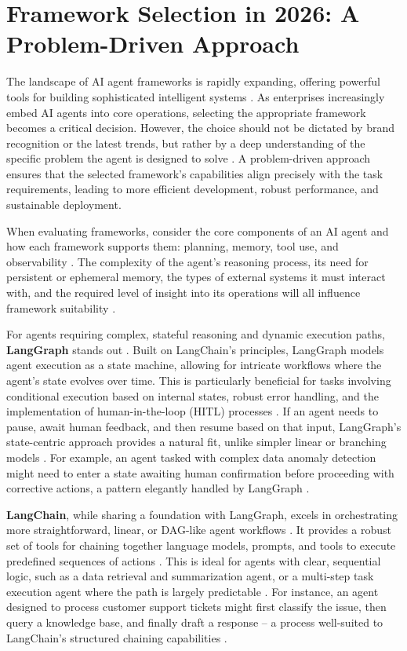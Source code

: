 \section{Framework Selection in 2026: A Problem-Driven Approach}

The landscape of AI agent frameworks is rapidly expanding, offering powerful tools for building sophisticated intelligent systems \cite{Reger2026}. As enterprises increasingly embed AI agents into core operations, selecting the appropriate framework becomes a critical decision. However, the choice should not be dictated by brand recognition or the latest trends, but rather by a deep understanding of the specific problem the agent is designed to solve \cite{Gartner2025}. A problem-driven approach ensures that the selected framework's capabilities align precisely with the task requirements, leading to more efficient development, robust performance, and sustainable deployment.

When evaluating frameworks, consider the core components of an AI agent and how each framework supports them: planning, memory, tool use, and observability \cite{Reger2026}. The complexity of the agent's reasoning process, its need for persistent or ephemeral memory, the types of external systems it must interact with, and the required level of insight into its operations will all influence framework suitability \cite{Gartner2025}.

For agents requiring complex, stateful reasoning and dynamic execution paths, \textbf{LangGraph} stands out \cite{LangGraphDocs}. Built on LangChain's principles, LangGraph models agent execution as a state machine, allowing for intricate workflows where the agent's state evolves over time. This is particularly beneficial for tasks involving conditional execution based on internal states, robust error handling, and the implementation of human-in-the-loop (HITL) processes \cite{Reger2026}. If an agent needs to pause, await human feedback, and then resume based on that input, LangGraph's state-centric approach provides a natural fit, unlike simpler linear or branching models \cite{LangGraphDocs}. For example, an agent tasked with complex data anomaly detection might need to enter a state awaiting human confirmation before proceeding with corrective actions, a pattern elegantly handled by LangGraph \cite{Reger2026}.

\textbf{LangChain}, while sharing a foundation with LangGraph, excels in orchestrating more straightforward, linear, or DAG-like agent workflows \cite{LangChainDocs}. It provides a robust set of tools for chaining together language models, prompts, and tools to execute predefined sequences of actions \cite{Reger2026}. This is ideal for agents with clear, sequential logic, such as a data retrieval and summarization agent, or a multi-step task execution agent where the path is largely predictable \cite{LangChainDocs}. For instance, an agent designed to process customer support tickets might first classify the issue, then query a knowledge base, and finally draft a response – a process well-suited to LangChain's structured chaining capabilities \cite{Reger2026}.

